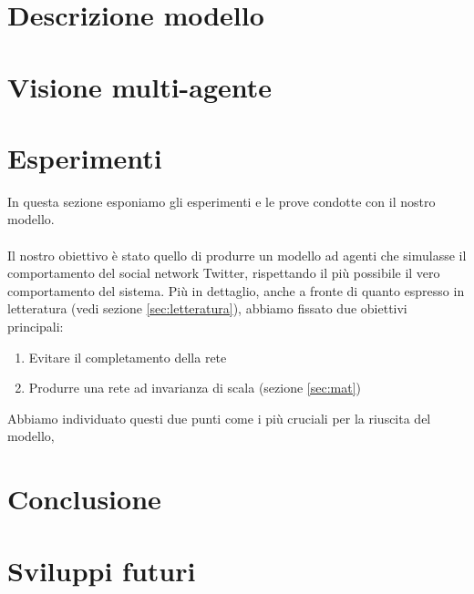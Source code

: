 \documentclass[a4paper,12pt]{article}
\begin{document}
\section{Descrizione modello} 
\label{sec:mod}
\section{Visione multi-agente}
\label{sec:mas}
\section{Esperimenti}
\label{sec:esp}
In questa sezione esponiamo gli esperimenti e le prove condotte con il nostro modello.\\
\\
Il nostro obiettivo è stato quello di produrre un modello ad agenti che simulasse il comportamento del social network Twitter, rispettando il più possibile il vero comportamento del sistema. Più in dettaglio, anche a fronte di quanto espresso in letteratura (vedi sezione \ref{sec:letteratura}), abbiamo fissato due obiettivi principali:
\begin{enumerate}
\item Evitare il completamento della rete
\item Produrre una rete ad invarianza di scala (sezione \ref{sec:mat})
\end{enumerate}
Abbiamo individuato questi due punti come i più cruciali per la riuscita del modello, 
\section{Conclusione}
\label{sec:end}
\section{Sviluppi futuri}
\label{sec:future}
\end{document}
